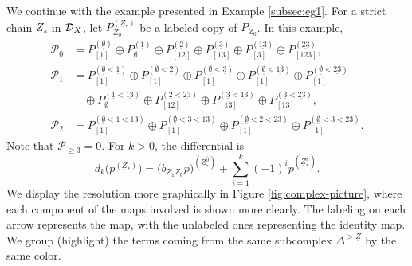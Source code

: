 \documentclass[a4paper,leqno]{amsart}
\begin{document}
\begin{eg}\label{subsec:eg2}
We continue with the example presented in Example \ref{subsec:eg1}. For a strict chain $\underline{Z}_\ast$ in $\mathcal D_X$, let $P_{Z_0}^{(\underline{Z}_\ast)}$ be a labeled copy of $P_{Z_0}$.  
In this example,
 \begin{align*}
 \mathcal P_0 & = P_{[1]}^{(\underline{\emptyset})}\oplus P_{\emptyset}^{(\underline{1})}\oplus P_{[12]}^{(\underline{2})}\oplus P_{[13]}^{(\underline{3})}\oplus P_{[3]}^{(\underline{13})}\oplus P_{[123]}^{(\underline{23})},\\
 \mathcal P_1 & = P_{[1]}^{(\underline{\emptyset}<\underline{1})}\oplus P_{[1]}^{(\emptyset<\underline{2})}\oplus P_{[1]}^{(\underline{\emptyset}<\underline{3})}  \oplus P_{[1]}^{(\underline{\emptyset}<\underline{13})}\oplus P_{[1]}^{(\underline{\emptyset}<\underline{23})}\\
 & \quad\oplus P_{\emptyset}^{(\underline{1}<\underline{13})}\oplus P_{[12]}^{(\underline{2}<\underline{23})}\oplus P_{[13]}^{(\underline{3}<\underline{13})}\oplus P_{[13]}^{(\underline{3}<\underline{23})},\\
 \mathcal P_2 & = P_{[1]}^{(\underline{\emptyset}<
 \underline{1}<
 \underline{13})}\oplus P_{[1]}^{(\underline{\emptyset}<
 \underline{3}<
 \underline{13})}\oplus P_{[1]}^{(\underline{\emptyset}<
 \underline{2}<
 \underline{23})}\oplus P_{[1]}^{(\underline{\emptyset}<
 \underline{3}<
 \underline{23})}.
\end{align*}
Note that $\mathcal P_{\ge 3}=0$.  For $k>0$, the differential is
\[
 d_k\bigl(p^{(\underline{Z}_\ast)}\bigr)=\bigl(b_{Z_1Z_0}p\bigr)^{(\underline{Z}_\ast^{\widehat{0}})}+\sum_{i=1}^{k}(-1)^ip^{(\underline{Z}_\ast^{\widehat{i}})}.
\]
We display the resolution more graphically in Figure \ref{fig:complex-picture}, where each component of the maps involved is shown more clearly.  The labeling on each arrow represents the map, with the unlabeled ones representing the identity map.  We group (highlight) the terms coming from the same subcomplex $\Delta^{>\underline{Z}}$ by the same color. 

\begin{figure}
    \centering
\end{figure}
\end{eg}
\end{document}

